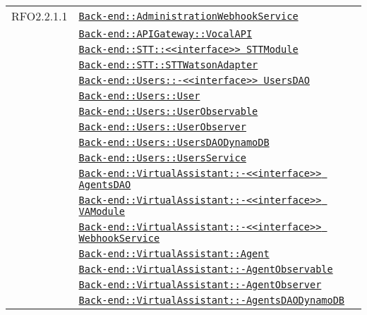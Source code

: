 \begin{longtable}{|>{\centering}m{3cm}|m{10cm}<{\centering}|}
RFO2.2.1.1 & \hyperref[Back-end::AdministrationWebhookService]{\texttt{Back-end::AdministrationWebhookService}}\\
& \hyperref[Back-end::APIGateway::VocalAPI]{\texttt{Back-end::APIGateway::VocalAPI}}\\
& \hyperref[Back-end::STT::<<interface>> STTModule]{\texttt{Back-end::STT::<<interface>> STTModule}}\\
& \hyperref[Back-end::STT::STTWatsonAdapter]{\texttt{Back-end::STT::STTWatsonAdapter}}\\
& \hyperref[Back-end::Users::<<interface>> UsersDAO]{\texttt{Back-end::Users::-\linebreak <<interface>> UsersDAO}}\\
& \hyperref[Back-end::Users::User]{\texttt{Back-end::Users::User}}\\
& \hyperref[Back-end::Users::UserObservable]{\texttt{Back-end::Users::UserObservable}}\\
& \hyperref[Back-end::Users::UserObserver]{\texttt{Back-end::Users::UserObserver}}\\
& \hyperref[Back-end::Users::UsersDAODynamoDB]{\texttt{Back-end::Users::UsersDAODynamoDB}}\\
& \hyperref[Back-end::Users::UsersService]{\texttt{Back-end::Users::UsersService}}\\
& \hyperref[Back-end::VirtualAssistant::<<interface>> AgentsDAO]{\texttt{Back-end::VirtualAssistant::-\linebreak <<interface>> AgentsDAO}}\\
& \hyperref[Back-end::VirtualAssistant::<<interface>> VAModule]{\texttt{Back-end::VirtualAssistant::-\linebreak <<interface>> VAModule}}\\
& \hyperref[Back-end::VirtualAssistant::<<interface>> WebhookService]{\texttt{Back-end::VirtualAssistant::-\linebreak <<interface>> WebhookService}}\\
& \hyperref[Back-end::VirtualAssistant::Agent]{\texttt{Back-end::VirtualAssistant::Agent}}\\
& \hyperref[Back-end::VirtualAssistant::AgentObservable]{\texttt{Back-end::VirtualAssistant::-\linebreak AgentObservable}}\\
& \hyperref[Back-end::VirtualAssistant::AgentObserver]{\texttt{Back-end::VirtualAssistant::-\linebreak AgentObserver}}\\
& \hyperref[Back-end::VirtualAssistant::AgentsDAODynamoDB]{\texttt{Back-end::VirtualAssistant::-\linebreak AgentsDAODynamoDB}}\\

\end{longtable}

